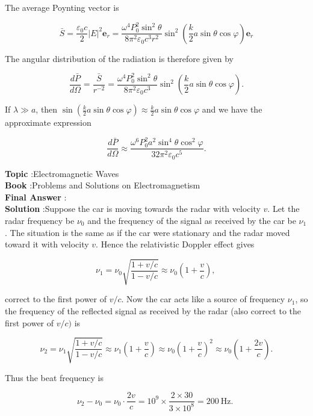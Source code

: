 \documentclass[10pt]{article}
\begin{document}
The average Poynting vector is

$$
\bar{S}=\frac{\varepsilon_{0} c}{2}|E|^{2} \mathbf{e}_{r}=\frac{\omega^{4} P_{0}^{2} \sin ^{2} \theta}{8 \pi^{2} \varepsilon_{0} c^{3} r^{2}} \sin ^{2}\left(\frac{k}{2} a \sin \theta \cos \varphi\right) \mathbf{e}_{r}
$$

The angular distribution of the radiation is therefore given by

$$
\frac{d \bar{P}}{d \Omega}=\frac{\bar{S}}{r^{-2}}=\frac{\omega^{4} P_{0}^{2} \sin ^{2} \theta}{8 \pi^{2} \varepsilon_{0} c^{3}} \sin ^{2}\left(\frac{k}{2} a \sin \theta \cos \varphi\right) .
$$

If $\lambda \gg a$, then $\sin \left(\frac{k}{2} a \sin \theta \cos \varphi\right) \approx \frac{k}{2} a \sin \theta \cos \varphi$ and we have the approximate expression

$$
\frac{d \bar{P}}{d \Omega} \approx \frac{\omega^{6} P_{0}^{2} a^{2} \sin ^{4} \theta \cos ^{2} \varphi}{32 \pi^{2} \varepsilon_{0} c^{5}} .
$$

\textbf{Topic} :Electromagnetic Waves\\
\textbf{Book} :Problems and Solutions on Electromagnetism\\
\textbf{Final Answer} : \\


\textbf{Solution} :Suppose the car is moving towards the radar with velocity $v$. Let the radar frequency be $\nu_{0}$ and the frequency of the signal as received by the car be $\nu_{1}$. The situation is the same as if the car were stationary and the radar moved toward it with velocity $v$. Hence the relativistic Doppler effect gives

$$
\nu_{1}=\nu_{0} \sqrt{\frac{1+v / c}{1-v / c}} \approx \nu_{0}\left(1+\frac{v}{c}\right) \text {, }
$$

correct to the first power of $v / c$. Now the car acts like a source of frequency $\nu_{1}$, so the frequency of the reflected signal as received by the radar (also correct to the first power of $v / c)$ is

$$
\nu_{2}=\nu_{1} \sqrt{\frac{1+v / c}{1-v / c}} \approx \nu_{1}\left(1+\frac{v}{c}\right) \approx \nu_{0}\left(1+\frac{v}{c}\right)^{2} \approx \nu_{0}\left(1+\frac{2 v}{c}\right) .
$$

Thus the beat frequency is

$$
\nu_{2}-\nu_{0}=\nu_{0} \cdot \frac{2 v}{c}=10^{9} \times \frac{2 \times 30}{3 \times 10^{8}}=200 \mathrm{~Hz} \text {. }
$$
\end{document}
